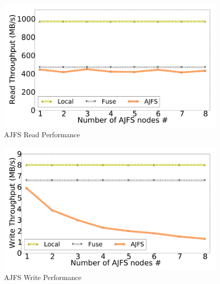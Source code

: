 \begin{figure}[Ht]
\includegraphics[width=\linewidth]{readperf.pdf}
\caption{AJFS Read Performance}
\label{fig:readperf}
\vspace{-5mm}
\end{figure}

\begin{figure}[Ht]
\includegraphics[width=\linewidth]{writeperf.pdf}
\caption{AJFS Write Performance}
\label{fig:writeperf}
\vspace{-5mm}
\end{figure}

